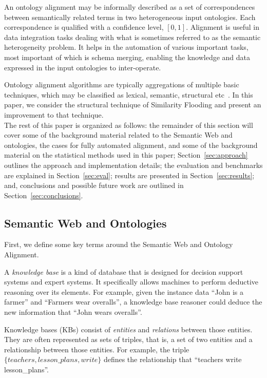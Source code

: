 \documentclass[letterpaper,twocolumn,12pt]{article}
\begin{document}
An ontology alignment may be informally described as a set of correspondences between semantically related terms in two heterogeneous input ontologies. 
Each correspondence is qualified with a confidence level, $[0,1]$.
Alignment is useful in data integration tasks dealing with what is sometimes referred to as the semantic heterogeneity problem. 
It helps in the automation of various important tasks, most important of which is schema merging, enabling the knowledge and data expressed in the input ontologies to inter-operate.

Ontology alignment algorithms are typically aggregations of multiple basic techniques, which may be classified as lexical, semantic, structural etc~\cite{euzenat:2007:ontology}.
In this paper, we consider the structural technique of Similarity Flooding and present an improvement to that technique. \\

\noindent The rest of this paper is organized as follows: 
the remainder of this section will cover some of the background material related to the Semantic Web and ontologies, the cases for fully automated alignment, and some of the background material on the statistical methods used in this paper; 
Section~\ref{sec:approach} outlines the approach and implementation details; 
the evaluation and benchmarks are explained in Section~\ref{sec:eval}; 
results are presented in Section~\ref{sec:results}; and, 
conclusions and possible future work are outlined in Section~\ref{sec:conclusions}.

\subsection{Semantic Web and Ontologies}
\label{subsec:semanticweb}
First, we define some key terms around the Semantic Web and Ontology Alignment.

A \textit{knowledge base} is a kind of database that is designed for decision support systems and expert systems. 
It specifically allows machines to perform deductive reasoning over its elements.
For example, given the instance data ``John is a farmer'' and ``Farmers wear overalls'', a knowledge base reasoner could deduce the new information that ``John wears overalls''.

Knowledge bases (KBs) consist of \textit{entities} and \textit{relations} between those entities. 
They are often represented as sets of triples, that is, a set of two entities and a relationship between those entities. 
For example, the triple ${\{teachers, lesson\_plans, write\}}$ defines the relationship that ``teachers write lesson\_plans''.
\end{document}
